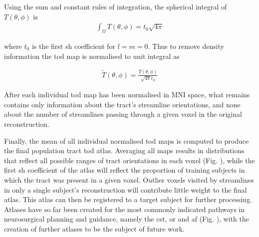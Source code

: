 Using the sum and constant rules of integration, the spherical integral of $T(\theta,\phi)$ is
\begin{align}
  \int_{\Omega} T(\theta,\phi) = t_0 \sqrt{4\pi}
\end{align}

where $t_0$ is the first \gls{sh} coefficient for $l=m=0$. Thus to remove density information the \gls{tod} map is normalised to unit integral as

\begin{align}
  \widetilde{T}(\theta, \phi) = \frac{T(\theta,\phi)}{\sqrt{4\pi} t_0}
\end{align}

After each individual \gls{tod} map has been normalised in MNI space, what remains contains only information about the tract's streamline orientations, and none about the number of streamlines passing through a given voxel in the original reconstruction.

Finally, the mean of all individual normalised \gls{tod} maps is computed to produce the final population tract \gls{tod} atlas.
Averaging all maps results in distributions that reflect all possible ranges of tract orientations in each voxel (Fig. ), while the first \gls{sh} coefficient of the atlas will reflect the proportion of training subjects in which the tract was present in a given voxel.
Outlier voxels visited by streamlines in only a single subject's reconstruction will contribute little weight to the final atlas.
This atlas can then be registered to a target subject for further processing.
Atlases have so far been created for the most commonly indicated pathways in neurosurgical planning and guidance, namely the \gls{cst}, \gls{or} and \gls{af} (Fig. ), with the creation of further atlases to be the subject of future work.

%
